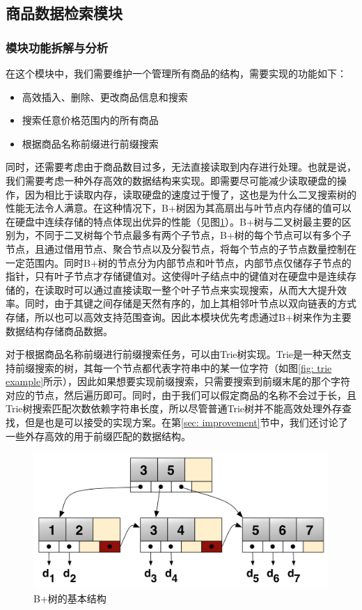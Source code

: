 \documentclass[cn,hazy,blue,10pt,normal]{elegantnote}
\begin{document}
\subsection{商品数据检索模块}
\label{sec: goods}
\subsubsection{模块功能拆解与分析}
在这个模块中，我们需要维护一个管理所有商品的结构，需要实现的功能如下：
\begin{itemize}
    \item 高效插入、删除、更改商品信息和搜索
    \item 搜索任意价格范围内的所有商品
    \item 根据商品名称前缀进行前缀搜索
\end{itemize}
同时，还需要考虑由于商品数目过多，无法直接读取到内存进行处理。也就是说，我们需要考虑一种外存高效的数据结构来实现。即需要尽可能减少读取硬盘的操作，因为相比于读取内存，读取硬盘的速度过于慢了，这也是为什么二叉搜索树的性能无法令人满意。在这种情况下，B+树因为其高扇出与叶节点内存储的值可以在硬盘中连续存储的特点体现出优异的性能（见图\ref{fig: bplustree}）。B+树与二叉树最主要的区别为，不同于二叉树每个节点最多有两个子节点，B+树的每个节点可以有多个子节点，且通过借用节点、聚合节点以及分裂节点，将每个节点的子节点数量控制在一定范围内。同时B+树的节点分为内部节点和叶节点，内部节点仅储存子节点的指针，只有叶子节点才存储键值对。这使得叶子结点中的键值对在硬盘中是连续存储的，在读取时可以通过直接读取一整个叶子节点来实现搜索，从而大大提升效率。同时，由于其键之间存储是天然有序的，加上其相邻叶节点以双向链表的方式存储，所以也可以高效支持范围查询。因此本模块优先考虑通过B+树来作为主要数据结构存储商品数据。

对于根据商品名称前缀进行前缀搜索任务，可以由Trie树实现。Trie是一种天然支持前缀搜索的树，其每一个节点都代表字符串中的某一位字符（如图\ref{fig: trie example}所示），因此如果想要实现前缀搜索，只需要搜索到前缀末尾的那个字符对应的节点，然后遍历即可。同时，由于我们可以假定商品的名称不会过于长，且Trie树搜索匹配次数依赖字符串长度，所以尽管普通Trie树并不能高效处理外存查找，但是也是可以接受的实现方案。在第\ref{sec: improvement}节中，我们还讨论了一些外存高效的用于前缀匹配的数据结构。

\begin{figure}[t]
    \begin{center}
    \centerline{\includegraphics[width=0.8\columnwidth]{image/Bplustree.png}}
    \caption{B+树的基本结构}
    \label{fig: bplustree}
    \end{center}
\end{figure}
\end{document}
